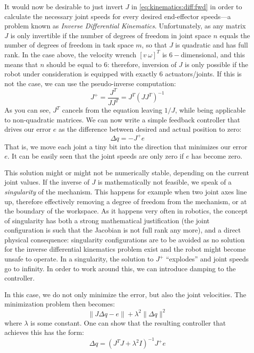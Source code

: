 It would now be desirable to just invert $J$ in \cref{eq:kinematics:diff:fwd} in order to calculate the necessary joint speeds for every desired end-effector speeds---a problem known as \textsl{Inverse Differential Kinematics}. Unfortunately, as any matrix $J$ is only invertible if the number of degrees of freedom in joint space $n$ equals the number of degrees of freedom in task space $m$, so that $ J$ is quadratic and has full rank.
In the case above, the velocity wrench $[v \ \omega]^T$ is $6-$dimensional, and this means that $n$ should be equal to $6$: therefore, inversion of $J$ is only possible if the robot under consideration is equipped with exactly $6$ actuators/joints.
If this is not the case, we can use the pseudo-inverse computation:
\begin{equation}
J^+=\frac{J^T}{JJ^T}=J^T(JJ^T)^{-1}\label{eq:kinematics:diff:pseudoinverse}
\end{equation}
As you can see, $J^T$ cancels from the equation leaving $1/J$, while being applicable to non-quadratic matrices.
We can now write a simple feedback controller that drives our error $e$ as the difference between desired and actual position to zero:
\begin{equation}
\Delta{q}=-J^+e
\end{equation}
That is, we move each joint a tiny bit into the direction that minimizes our error $e$.
It can be easily seen that the joint speeds are only zero if $e$ has become zero.

This solution might or might not be numerically stable, depending on the current joint values. If the inverse of $J$ is mathematically not feasible, we speak of a \textsl{singularity} of the mechanism. This happens for example when two joint axes line up, therefore effectively removing a degree of freedom from the mechanism, or at the boundary of the workspace. As it happens very often in robotics, the concept of singularity has both a strong mathematical justification (the joint configuration is such that the Jacobian is not full rank any more), and a direct physical consequence: singularity configurations are to be avoided as no solution for the inverse differential kinematics problem exist and the robot might become unsafe to operate.
In a singularity, the solution to $ J^+$ ``explodes'' and joint speeds go to infinity. In order to work around this, we can introduce damping to the controller.

In this case, we do not only minimize the error, but also the joint velocities. The minimization problem then becomes:
\begin{equation}
\|J\Delta q-e\|+\lambda^2\|\Delta q\|^2
\end{equation}
where $\lambda$ is some constant. One can show that the resulting controller that achieves this has the form:
\begin{equation}
\Delta q=(J^TJ+\lambda^2 I)^{-1}J^+e
\end{equation}

